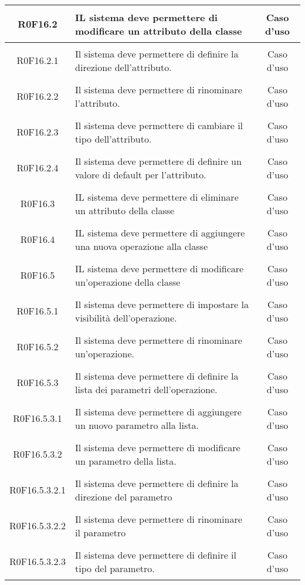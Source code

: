 \documentclass[../AnalisiDeiRequisiti.tex]{subfiles}
\begin{document}
\begin{longtable}{|c|>{\centering}p{7cm}|c|}
\hypertarget{R0F16.2}{R0F16.2} & IL sistema deve permettere di modificare un attributo della classe & Caso d'uso \\ \hline
\hypertarget{R0F16.2.1}{R0F16.2.1} & Il sistema deve permettere di definire la direzione dell'attributo. & Caso d'uso \\ \hline
\hypertarget{R0F16.2.2}{R0F16.2.2} & Il sistema deve permettere di rinominare l'attributo. & Caso d'uso \\ \hline
\hypertarget{R0F16.2.3}{R0F16.2.3} & Il sistema deve permettere di cambiare il tipo dell'attributo. & Caso d'uso \\ \hline
\hypertarget{R0F16.2.4}{R0F16.2.4} & Il sistema deve permettere di definire un valore di default per l'attributo. & Caso d'uso \\ \hline
\hypertarget{R0F16.3}{R0F16.3} & IL sistema deve permettere di eliminare un attributo della classe & Caso d'uso \\ \hline
\hypertarget{R0F16.4}{R0F16.4} & IL sistema deve permettere di aggiungere una nuova operazione alla classe & Caso d'uso \\ \hline
\hypertarget{R0F16.5}{R0F16.5} & IL sistema deve permettere di modificare un'operazione della classe & Caso d'uso \\ \hline
\hypertarget{R0F16.5.1}{R0F16.5.1} & Il sistema deve permettere di impostare la visibilità dell'operazione. & Caso d'uso \\ \hline
\hypertarget{R0F16.5.2}{R0F16.5.2} & Il sistema deve permettere di rinominare un'operazione.  & Caso d'uso \\ \hline
\hypertarget{R0F16.5.3}{R0F16.5.3} & Il sistema deve permettere di definire la lista dei parametri dell'operazione. & Caso d'uso \\ \hline
\hypertarget{R0F16.5.3.1}{R0F16.5.3.1} & Il sistema deve permettere di aggiungere un nuovo parametro alla lista. & Caso d'uso \\ \hline
\hypertarget{R0F16.5.3.2}{R0F16.5.3.2} & Il sistema deve permettere di modificare un parametro della lista. & Caso d'uso \\ \hline
\hypertarget{R0F16.5.3.2.1}{R0F16.5.3.2.1} & Il sistema deve permettere di definire la direzione del parametro & Caso d'uso \\ \hline
\hypertarget{R0F16.5.3.2.2}{R0F16.5.3.2.2} & Il sistema deve permettere di rinominare il parametro & Caso d'uso \\ \hline
\hypertarget{R0F16.5.3.2.3}{R0F16.5.3.2.3} & Il sistema deve permettere di definire il tipo del parametro. & Caso d'uso \\ \hline

\end{longtable}
\end{document}

